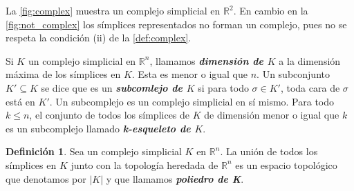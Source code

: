 \documentclass[10pt]{report}
\newcommand{\R}{\mathbb{R}}
\newcommand{\enfatiza}[1]{\textbf{\textit{#1}}}
\theoremstyle{definition}
\newtheorem{defin}{Definición}[section]
\begin{document}
La \autoref{fig:complex} muestra un complejo simplicial en $\R^2$. En cambio en la \autoref{fig:not_complex} los símplices representados no forman un complejo, pues no se respeta la condición (ii) de la \autoref{def:complex}.

Si $K$ un complejo simplicial en $\R ^n$, llamamos \enfatiza{dimensión de $K$} a la dimensión máxima de los símplices en $K$. Esta es menor o igual que $n$.
Un subconjunto $K'\subseteq K$ se dice que es un \enfatiza{subcomlejo de $K$} si para todo $\sigma \in K'$, toda cara de $\sigma$ está en $K'$. Un subcomplejo es un complejo simplicial en sí mismo.
Para todo $k\leq n$, el conjunto de todos los símplices de $K$ de dimensión menor o igual que $k$ es un subcomplejo llamado \enfatiza{k-esqueleto de $K$}.






\begin{defin}%
Sea un complejo simplicial $K$ en $\R ^n$. La unión de todos los símplices en $K$ junto con la topología heredada de $\R ^n$ es un espacio topológico que denotamos por $|K|$ y que llamamos \enfatiza{poliedro de K}.
\end{defin}
\end{document}
